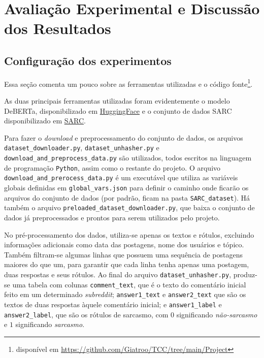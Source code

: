 

\chapter{Avaliação Experimental e Discussão dos Resultados}%
\label{cha:avaliacao_experimental_e_discussao_dos_resultados}

\section{Configuração dos experimentos}%
\label{sec:configuracao_dos_experimentos}

Essa seção comenta um pouco sobre as ferramentas utilizadas e o
código fonte\footnote{disponível em
\href{https://github.com/Giatroo/TCC/tree/main/Project}{https://github.com/Giatroo/TCC/tree/main/Project}}.

As duas principais ferramentas utilizadas foram evidentemente o modelo
DeBERTa, disponibilizado em
\href{https://huggingface.co/docs/transformers/model_doc/deberta}{HuggingFace}
e o conjunto de dados SARC disponibilizado em
\href{https://nlp.cs.princeton.edu/SARC/}{SARC}.

Para fazer o \textit{download} e preprocessamento do conjunto de dados, os
arquivos \texttt{dataset\_downloader.py}, \texttt{dataset\_unhasher.py} e
\texttt{download\_and\_preprocess\_data.py} são utilizados, todos escritos na
linguagem de programação \texttt{Python}, assim como o restante do projeto. O
arquivo \texttt{download\_and\_prerocess\_data.py} é um executável que utiliza
as variáveis globais definidas em \texttt{global\_vars.json} para definir o
caminho onde ficarão os arquivos do conjunto de dados (por padrão, ficam na
pasta \texttt{SARC\_dataset}). Há também o arquivo
\texttt{preloaded\_dataset\_downloader.py}, que baixa o conjunto de dados já
preprocessados e prontos para serem utilizados pelo projeto.

No pré-processamento dos dados, utiliza-se apenas os textos e rótulos,
excluindo informações adicionais como data das postagens, nome dos usuários e
tópico. Também filtram-se algumas linhas que possuem uma sequência de postagens
maiores do que um, para garantir que cada linha tenha apenas uma postagem, duas
respostas e seus rótulos. Ao final do arquivo \texttt{dataset\_unhasher.py},
produz-se uma tabela com colunas \texttt{comment\_text}, que é o texto do
comentário inicial feito em um determinado \textit{subreddit};
\texttt{answer1\_text} e \texttt{answer2\_text} que são os textos de duas
respostas àquele comentário inicial; e \texttt{answer1\_label} e
\texttt{answer2\_label}, que são os rótulos de sarcasmo, com $0$ significando
\textit{não-sarcasmo} e $1$ significando \textit{sarcasmo}.

